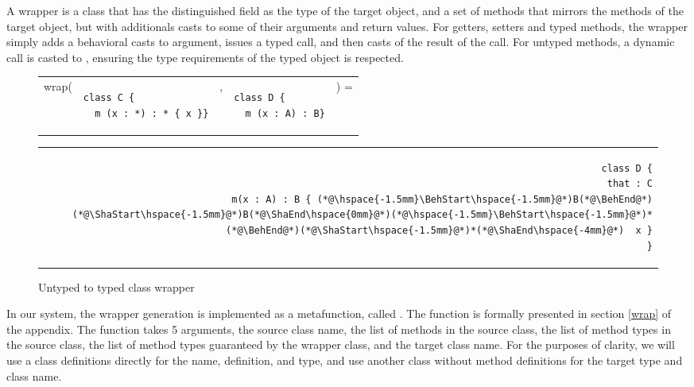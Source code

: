\documentclass[a4paper,USenglish]{tex/lipics-v2016}
\begin{document}
A wrapper is a class that has the distinguished field \that as the type of the target object, and a set of 
methods that mirrors the methods of the target object, but with additionals 
casts to some of their arguments and return values. For getters, setters and typed methods, 
the wrapper simply adds a behavioral casts to argument, issues a typed call, and 
then casts of the result of the call. For untyped methods, a dynamic call is casted to \any, 
ensuring the type requirements of the typed object is respected.


\begin{figure}[!ht]
\begin{tabular}{ER{4.5cm}ER{3.5cm}E}
wrap( & 
\begin{lstlisting}
class C {
  m (x : *) : * { x }}
\end{lstlisting}& , &
\begin{lstlisting}
class D {
  m (x : A) : B}
\end{lstlisting}&) =
\end{tabular}
\begin{tabular}{@{}l@{}r@{}}
\hspace{4.8cm} \,&
\begin{minipage}{\textwidth-5cm}
\begin{lstlisting}
class D {
  that : C
  m(x : A) : B { (*@\hspace{-1.5mm}\BehStart\hspace{-1.5mm}@*)B(*@\BehEnd@*)(*@\ShaStart\hspace{-1.5mm}@*)B(*@\ShaEnd\hspace{0mm}@*)(*@\hspace{-1.5mm}\BehStart\hspace{-1.5mm}@*)*(*@\BehEnd@*)(*@\ShaStart\hspace{-1.5mm}@*)*(*@\ShaEnd\hspace{-4mm}@*)  x }
}
\end{lstlisting}
\end{minipage}
\end{tabular}
\caption{Untyped to typed class wrapper}
\label{fig:rktex1}
\end{figure}

In our system, the wrapper generation is implemented as a metafunction, called
. The  function is formally presented in section \ref{wrap} of the appendix. 
The  function takes 5 arguments, the source class
name, the list of methods in the source class, the list of method types in the
source class, the list of method types guaranteed by the wrapper class,
and the target class name. For the purposes of clarity, we will use a class
definitions directly for the name, definition, and type, and use another class
without method definitions for the target type and class name.
\end{document}
